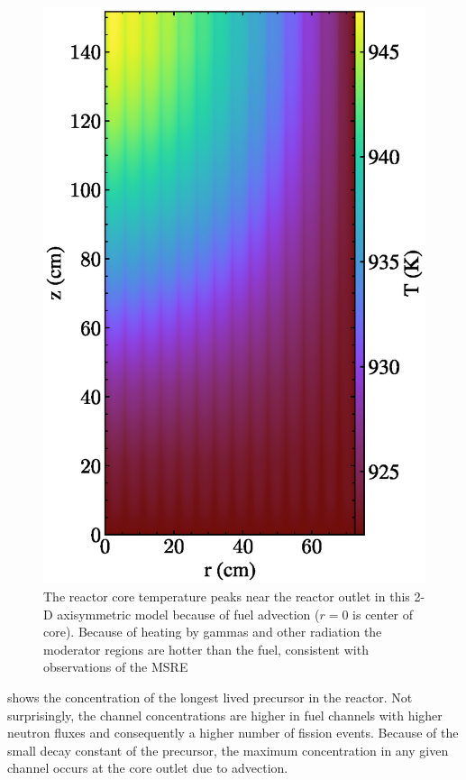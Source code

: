 \documentclass{article}
\begin{document}
\begin{figure}[htpb]
  \centering
  \includegraphics{2d_gamma_heating_temp.eps}
        \caption{The reactor core temperature peaks near the reactor outlet in
          this 2-D axisymmetric model because of fuel advection ($r=0$ is center
          of core). Because of heating by gammas and other radiation the
          moderator regions are hotter than the fuel, consistent with
          observations of the \gls{MSRE}}
  \label{fig:temp}
\end{figure}

 shows the concentration of the longest lived precursor in the
reactor. Not surprisingly, the channel concentrations are higher in fuel channels
with higher neutron fluxes and consequently a higher number of fission
events. Because of the small decay constant of the precursor, the maximum
concentration in any given channel occurs at the core outlet due to advection.
\end{document}
